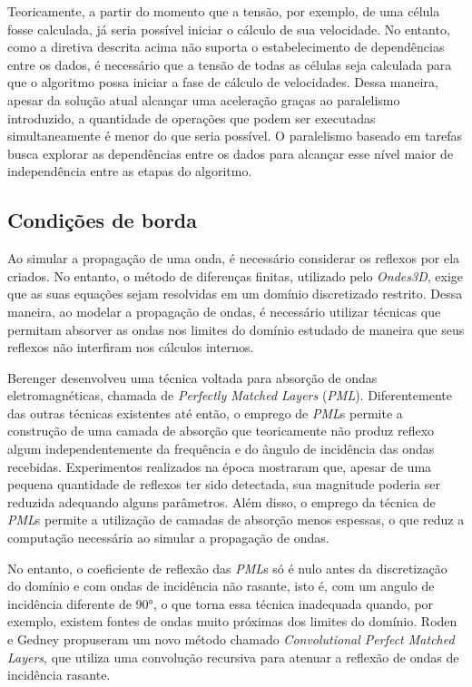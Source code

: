 \documentclass[cic,tc]{iiufrgs}
\begin{document}
Teoricamente, a partir do momento que a tensão, por exemplo, de uma célula fosse calculada, já seria possível iniciar o cálculo de sua velocidade. No entanto, como a diretiva descrita acima 
não suporta o estabelecimento de dependências entre os dados, é necessário que a tensão de todas as células seja calculada para que o algoritmo possa iniciar a fase de cálculo
de velocidades. Dessa maneira, apesar da solução atual alcançar uma aceleração graças ao paralelismo introduzido, a quantidade de operações que podem ser executadas simultaneamente
é menor do que seria possível. O paralelismo baseado em tarefas busca explorar as dependências entre os dados para alcançar esse nível maior de independência entre as etapas do
algoritmo.

\subsection{Condições de borda}

Ao simular a propagação de uma onda, é necessário considerar os reflexos por ela criados. No entanto, o método de diferenças finitas, utilizado pelo \textit{Ondes3D}, exige que as suas
equações sejam resolvidas em um domínio discretizado restrito. Dessa maneira, ao modelar a propagação de ondas, é necessário utilizar técnicas que permitam absorver as ondas nos limites
do domínio estudado de maneira que seus reflexos não interfiram nos cálculos internos.

Berenger \cite{PML} desenvolveu uma técnica voltada para absorção de ondas eletromagnéticas, chamada de \textit{Perfectly Matched Layers} (\textit{PML}). Diferentemente
das outras técnicas existentes até então, o emprego de \textit{PML}s permite a construção de uma camada de absorção que teoricamente não produz reflexo algum independentemente
da frequência e do ângulo de incidência das ondas recebidas. Experimentos realizados na época mostraram que, apesar de uma pequena quantidade de reflexos ter sido detectada,
sua magnitude poderia ser reduzida adequando alguns parâmetros. Além disso, o emprego da técnica de \textit{PML}s permite a utilização de camadas de absorção menos espessas, o que
reduz a computação necessária ao simular a propagação de ondas.

No entanto, o coeficiente de reflexão das \textit{PML}s só é nulo antes da discretização do domínio e com ondas de incidência não rasante, isto é, com um angulo de incidência
diferente de $90$°, o que torna essa técnica inadequada quando, por exemplo, existem fontes de ondas muito próximas dos limites do domínio. Roden e Gedney \cite{CPML} propuseram
um novo método chamado \textit{Convolutional Perfect Matched Layers}, que utiliza uma convolução recursiva para atenuar a reflexão de ondas de incidência rasante.
\end{document}
